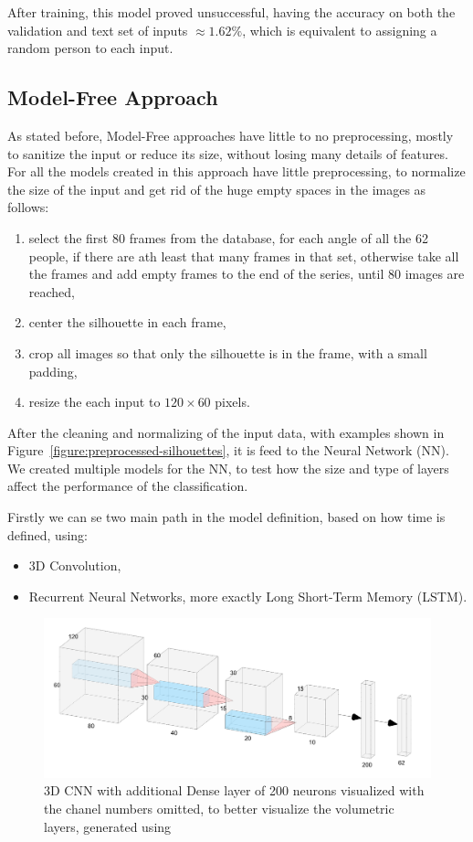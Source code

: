 \documentclass[12pt]{article}
\theoremstyle{definition}
\begin{document}
	After training, this model proved unsuccessful, having the accuracy on both the validation and text set of inputs $\approx 1.62\%$, which is equivalent to assigning a random person to each input.

	\subsection{Model-Free Approach}

	As stated before, Model-Free approaches have little to no preprocessing, mostly to sanitize the input or reduce its size, without losing many details of features. For all the models created in this approach have little preprocessing, to normalize the size of the input and get rid of the huge empty spaces in the images as follows:
	\begin{enumerate}
		\item select the first 80 frames from the database, for each angle of all the 62 people, if there are ath least that many frames in that set, otherwise take all the frames and add empty frames to the end of the series, until 80 images are reached,
		\item center the silhouette in each frame,
		\item crop all images so that only the silhouette is in the frame, with a small padding,
		\item resize the each input to $120 \times 60$ pixels.
	\end{enumerate}

	After the cleaning and normalizing of the input data, with examples shown in Figure~\ref{figure:preprocessed-silhouettes}, it is feed to the Neural Network (NN). We created multiple models for the NN, to test how the size and type of layers affect the performance of the classification.

	Firstly we can se two main path in the model definition, based on how time is defined, using:
	\begin{itemize}
		\item 3D Convolution,
		\item Recurrent Neural Networks, more exactly Long Short-Term Memory (LSTM).
	\end{itemize}

	\begin{figure}[ht]
		\includegraphics[width=\textwidth]{networks/3D-CNN-200-Dense.png}
		\caption{3D CNN with additional Dense layer of 200 neurons visualized with the chanel numbers omitted, to better visualize the volumetric layers, generated using \cite{nn-svg}}
		\label{figure:3D-CNN-200-Dense}
	\end{figure}
\end{document}
